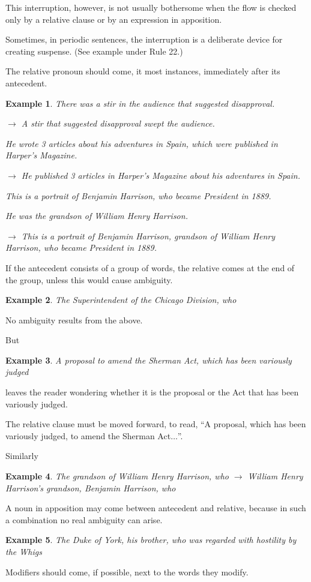 \documentclass{article}
\newtheorem{example}{Example}
\begin{document}
This interruption, however, is not usually bothersome when the flow is checked only by a relative clause or by an expression in apposition.

Sometimes, in periodic sentences, the interruption is a deliberate device for creating suspense. (See example under Rule 22.)

%
The relative pronoun should come, it most instances, immediately after its antecedent.
\begin{example}
	There was a stir in the audience that suggested disapproval.
	
	$\to$ A stir that suggested disapproval swept the audience.
	
	He wrote 3 articles about his adventures in Spain, which were published in \emph{Harper's Magazine}.
	
	$\to$ He published 3 articles in \emph{Harper's Magazine} about his adventures in Spain.
	
	This is a portrait of Benjamin Harrison, who became President in 1889.
	
	He was the grandson of William Henry Harrison.
	
	$\to$ This is a portrait of Benjamin Harrison, grandson of William Henry Harrison, who became President in 1889.
\end{example}
If the antecedent consists of a group of words, the relative comes at the end of the group, unless this would cause ambiguity.
\begin{example}
	The Superintendent of the Chicago Division, who
\end{example}
No ambiguity results from the above.

But
\begin{example}
	A proposal to amend the Sherman Act, which has been variously judged
\end{example}
leaves the reader wondering whether it is the proposal or the Act that has been variously judged.

The relative clause must be moved forward, to read, ``A proposal, which has been variously judged, to amend the Sherman Act$\ldots$''.

Similarly
\begin{example}
	The grandson of William Henry Harrison, who $\to$ William Henry Harrison's grandson, Benjamin Harrison, who
\end{example}
A noun in apposition may come between antecedent and relative, because in such a combination no real ambiguity can arise.
\begin{example}
	The Duke of York, his brother, who was regarded with hostility by the Whigs
\end{example}
Modifiers should come, if possible, next to the words they modify.
\end{document}
